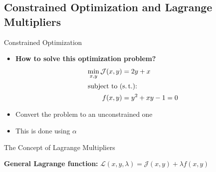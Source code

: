 \subsection{Constrained Optimization and Lagrange Multipliers}

\begin{frame}{Constrained Optimization}{}\important
	\begin{itemize}
		\item \textbf{How to solve this optimization problem?}
		\begin{align*}
			\min_{x, y} \mathcal{J}(x,y)
				&= 2y + x 		\\
			\intertext{subject to (s.\,t.):}
			f(x, y)
				&= y^2 + xy - 1 = 0
		\end{align*}
		\item Convert the problem to an unconstrained one
		\item This is done using  $\alpha$
	\end{itemize}
\end{frame}


\begin{frame}{The Concept of Lagrange Multipliers}{}\important
	\begin{boxBlueNoFrame}
		\textbf{General Lagrange function:} $\mathcal{L}(x, y, \lambda) = \mathcal{J}(x,y) + \lambda f(x,y)$
	\end{boxBlueNoFrame}

	\vspace*{3mm}
\end{frame}



